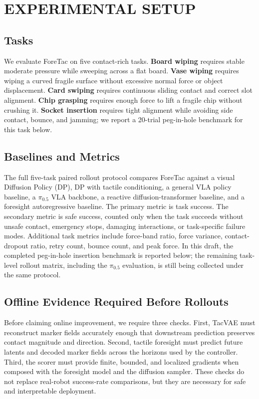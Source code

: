 \documentclass[letterpaper, 10 pt, conference]{ieeeconf}
\newcommand{\method}{ForeTac}
\begin{document}
\section{EXPERIMENTAL SETUP}

\subsection{Tasks}

We evaluate \method{} on five contact-rich tasks.
\textbf{Board wiping} requires stable moderate pressure while sweeping across a
flat board.
\textbf{Vase wiping} requires wiping a curved fragile surface without excessive
normal force or object displacement.
\textbf{Card swiping} requires continuous sliding contact and correct slot
alignment.
\textbf{Chip grasping} requires enough force to lift a fragile chip without
crushing it.
\textbf{Socket insertion} requires tight alignment while avoiding side contact,
bounce, and jamming; we report a 20-trial peg-in-hole benchmark for this task
below.

\subsection{Baselines and Metrics}

The full five-task paired rollout protocol compares \method{} against a visual
Diffusion Policy (DP), DP with tactile conditioning, a general VLA policy
baseline, a $\pi_{0.5}$ VLA backbone, a reactive diffusion-transformer
baseline, and a foresight autoregressive baseline. The primary metric is task
success. The secondary metric is safe success, counted only when the task
succeeds without unsafe contact, emergency stops, damaging interactions, or
task-specific failure modes. Additional task metrics include force-band ratio,
force variance, contact-dropout ratio, retry count, bounce count, and peak
force. In this draft, the completed peg-in-hole insertion benchmark is reported
below; the remaining task-level rollout matrix, including the $\pi_{0.5}$
evaluation, is still being collected under the same protocol.

\subsection{Offline Evidence Required Before Rollouts}

Before claiming online improvement, we require three checks. First, TacVAE must
reconstruct marker fields accurately enough that downstream prediction preserves
contact magnitude and direction. Second, tactile foresight must predict future
latents and decoded marker fields across the horizons used by the controller.
Third, the scorer must provide finite, bounded, and localized gradients when
composed with the foresight model and the diffusion sampler. These checks do not
replace real-robot success-rate comparisons, but they are necessary for safe and
interpretable deployment.
\end{document}

